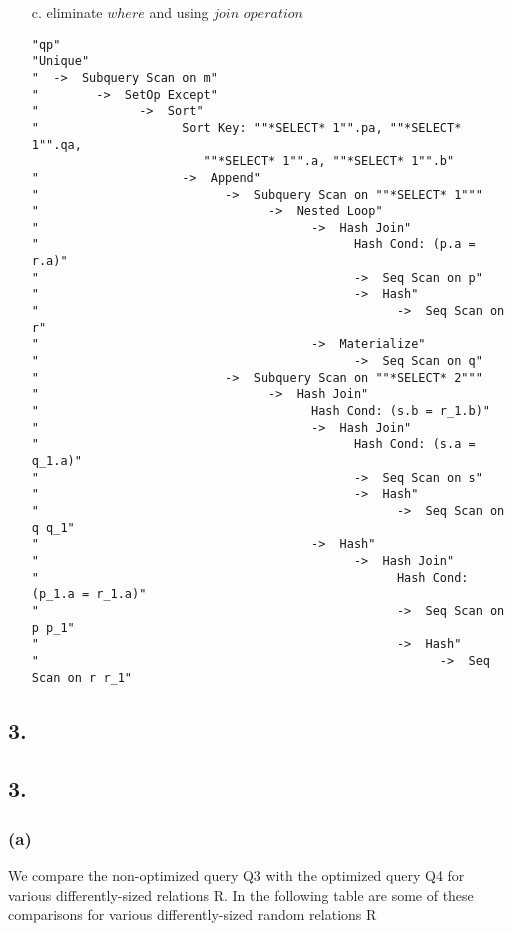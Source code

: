 \documentclass[10pt]{article}
\begin{document}
\begin{itemize}
\newpage
\item[c.] eliminate $where$ and using $join$ $ operation$\\
\begin{lstlisting}
"qp"
"Unique"
"  ->  Subquery Scan on m"
"        ->  SetOp Except"
"              ->  Sort"
"                    Sort Key: ""*SELECT* 1"".pa, ""*SELECT* 1"".qa, 
                        ""*SELECT* 1"".a, ""*SELECT* 1"".b"
"                    ->  Append"
"                          ->  Subquery Scan on ""*SELECT* 1"""
"                                ->  Nested Loop"
"                                      ->  Hash Join"
"                                            Hash Cond: (p.a = r.a)"
"                                            ->  Seq Scan on p"
"                                            ->  Hash"
"                                                  ->  Seq Scan on r"
"                                      ->  Materialize"
"                                            ->  Seq Scan on q"
"                          ->  Subquery Scan on ""*SELECT* 2"""
"                                ->  Hash Join"
"                                      Hash Cond: (s.b = r_1.b)"
"                                      ->  Hash Join"
"                                            Hash Cond: (s.a = q_1.a)"
"                                            ->  Seq Scan on s"
"                                            ->  Hash"
"                                                  ->  Seq Scan on q q_1"
"                                      ->  Hash"
"                                            ->  Hash Join"
"                                                  Hash Cond: (p_1.a = r_1.a)"
"                                                  ->  Seq Scan on p p_1"
"                                                  ->  Hash"
"                                                        ->  Seq Scan on r r_1"
\end{lstlisting}

\end{itemize}


\newpage
\subsection*{3.}
\subsection*{3.}
\subsubsection*{(a)}
We compare the non-optimized query Q3
with the optimized query Q4 for various differently-sized relations R. In the
following table are some of these comparisons for various differently-sized random relations R
\end{document}
